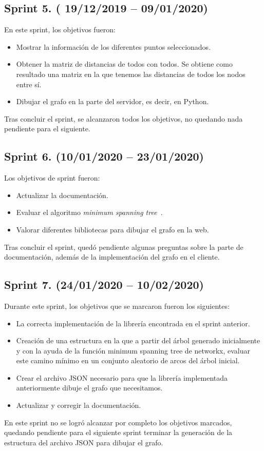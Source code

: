 \subsection{Sprint 5. ( 19/12/2019 -- 09/01/2020)}
En este sprint, los objetivos fueron:
\begin{itemize}
	\item Mostrar la información de los diferentes puntos seleccionados.
	\item Obtener la matriz de distancias de todos con todos. Se obtiene como resultado una matriz en la que tenemos las distancias de todos los nodos entre sí.
	\item Dibujar el grafo en la parte del servidor, es decir, en Python.
\end{itemize}
Tras concluir el sprint, se alcanzaron todos los objetivos, no quedando nada pendiente para el siguiente.
\subsection{Sprint 6. (10/01/2020 -- 23/01/2020)}
Los objetivos de sprint fueron:
\begin{itemize}
	\item Actualizar la documentación.
	\item Evaluar el algoritmo \textit{minimum spanning tree}~\cite{wiki:minimum-spanning-tree}.
	\item Valorar diferentes bibliotecas para dibujar el grafo en la web.
\end{itemize}
Tras concluir el sprint, quedó pendiente algunas preguntas sobre la parte de documentación, además de la implementación del grafo en el cliente.
\subsection{Sprint 7. (24/01/2020 -- 10/02/2020)}
Durante este sprint, los objetivos que se marcaron fueron los siguientes:
\begin{itemize}
	\item La correcta implementación de la librería encontrada en el sprint anterior.
	\item Creación de una estructura en la que a partir del árbol generado inicialmente y con la ayuda de la función minimum spanning tree de networkx, evaluar este camino mínimo en un conjunto aleatorio de arcos del árbol inicial.
	\item Crear el archivo JSON necesario para que la librería implementada anteriormente dibuje el grafo que necesitamos. 
	\item Actualizar y corregir la documentación.
\end{itemize}
En este sprint no se logró alcanzar por completo los objetivos marcados, quedando pendiente para el siguiente sprint terminar la generación de la estructura del archivo JSON para dibujar el grafo.


